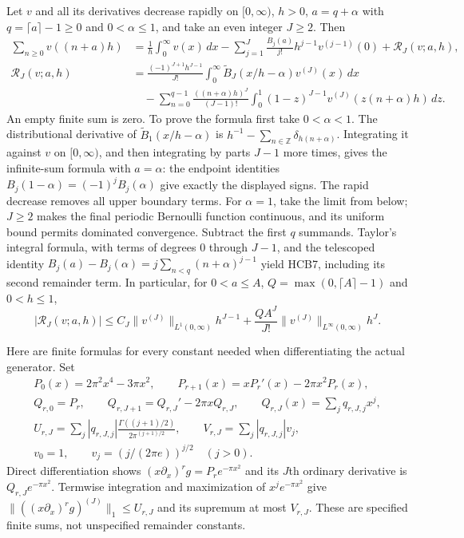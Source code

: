 \documentclass[11pt]{article}
\begin{document}
Let $v$ and all its derivatives decrease rapidly on $[0,\infty)$,
$h>0$, $a=q+\alpha$ with $q=\lceil a\rceil-1\geq0$ and
$0<\alpha\leq1$, and take an even integer $J\geq2$. Then
\begin{equation}\tag{HCB7}
\begin{split}
 \sum_{n\geq0}v((n+a)h)
 &=\frac1h\int_0^\infty v(x)\,dx
   -\sum_{j=1}^{J}\frac{B_j(a)}{j!}h^{j-1}v^{(j-1)}(0)
   +\mathcal R_J(v;a,h),\\
 \mathcal R_J(v;a,h)
 &=\frac{(-1)^{J+1}h^{J-1}}{J!}
       \int_0^\infty\widetilde B_J(x/h-\alpha)v^{(J)}(x)\,dx\\
 &\quad-\sum_{n=0}^{q-1}\frac{((n+\alpha)h)^J}{(J-1)!}
       \int_0^1(1-z)^{J-1}v^{(J)}(z(n+\alpha)h)\,dz.
\end{split}
\end{equation}
An empty finite sum is zero. To prove the formula first take
$0<\alpha<1$. The distributional derivative of
$\widetilde B_1(x/h-\alpha)$ is
$h^{-1}-\sum_{n\in\mathbb Z}\delta_{h(n+\alpha)}$.
Integrating it against $v$ on $[0,\infty)$, and then integrating
by parts $J-1$ more times, gives the infinite-sum formula with
$a=\alpha$: the endpoint identities
$B_j(1-\alpha)=(-1)^jB_j(\alpha)$ give exactly the displayed signs.
The rapid decrease removes all upper boundary terms. For
$\alpha=1$, take the limit from below; $J\geq2$ makes the final
periodic Bernoulli function continuous, and its uniform bound
permits dominated convergence. Subtract the first $q$ summands.
Taylor's integral formula, with terms of degrees $0$ through
$J-1$, and the telescoped identity
$B_j(a)-B_j(\alpha)=j\sum_{n<q}(n+\alpha)^{j-1}$ yield HCB7,
including its second remainder term. In particular, for $0<a\leq A$,
$Q=\max(0,\lceil A\rceil-1)$ and $0<h\leq1$,
\begin{equation}\tag{HCB8}
 |\mathcal R_J(v;a,h)|\leq
 C_J\|v^{(J)}\|_{L^1(0,\infty)}h^{J-1}
 +\frac{Q A^J}{J!}\|v^{(J)}\|_{L^\infty(0,\infty)}h^J.
\end{equation}

Here are finite formulas for every constant needed when differentiating
the actual generator. Set
\begin{equation}\tag{HCB9}
\begin{gathered}
 P_0(x)=2\pi^2x^4-3\pi x^2,\qquad
 P_{r+1}(x)=xP_r'(x)-2\pi x^2P_r(x),\\
 Q_{r,0}=P_r,\qquad Q_{r,J+1}=Q_{r,J}'-2\pi xQ_{r,J},\qquad
 Q_{r,J}(x)=\sum_j q_{r,J,j}x^j,\\
 U_{r,J}=\sum_j|q_{r,J,j}|
       \frac{\Gamma((j+1)/2)}{2\pi^{(j+1)/2}},\qquad
 V_{r,J}=\sum_j|q_{r,J,j}|v_j,\\
 v_0=1,\qquad v_j=(j/(2\pi e))^{j/2}\quad(j>0).
\end{gathered}
\end{equation}
Direct differentiation shows $(x\partial_x)^rg=P_re^{-\pi x^2}$
and its $J$th ordinary derivative is $Q_{r,J}e^{-\pi x^2}$.
Termwise integration and maximization of $x^je^{-\pi x^2}$ give
$\|((x\partial_x)^rg)^{(J)}\|_1\leq U_{r,J}$ and its supremum
at most $V_{r,J}$. These are specified finite sums, not unspecified
remainder constants.
\end{document}
